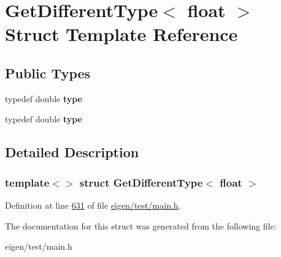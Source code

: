 \hypertarget{struct_get_different_type_3_01float_01_4}{}\section{Get\+Different\+Type$<$ float $>$ Struct Template Reference}
\label{struct_get_different_type_3_01float_01_4}
\subsection*{Public Types}
\begin{DoxyCompactItemize}
\item 
\mbox{\label{struct_get_different_type_3_01float_01_4_ad3b8d48122225f5a26b99e457c643b2f}} 
typedef double {\bfseries type}
\item 
\mbox{\label{struct_get_different_type_3_01float_01_4_ad3b8d48122225f5a26b99e457c643b2f}} 
typedef double {\bfseries type}
\end{DoxyCompactItemize}


\subsection{Detailed Description}
\subsubsection*{template$<$$>$\newline
struct Get\+Different\+Type$<$ float $>$}



Definition at line \hyperlink{eigen_2test_2main_8h_source_l00631}{631} of file \hyperlink{eigen_2test_2main_8h_source}{eigen/test/main.\+h}.



The documentation for this struct was generated from the following file\+:\begin{DoxyCompactItemize}
\item 
eigen/test/main.\+h\end{DoxyCompactItemize}
